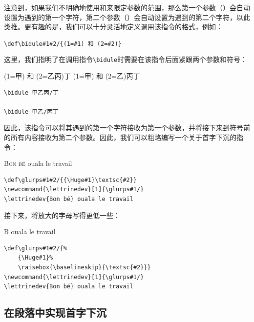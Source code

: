 注意到，如果我们不明确地使用\dm{\{}和\dm{\}}来限定参数的范围，那么第一个参数（）会自动设置为遇到的第一个字符，第二个参数（）会自动设置为遇到的第二个字符，以此类推。更有趣的是，我们可以十分灵活地定义调用该指令的格式，例如：

\begin{dmd}
\verb|\def\bidule#1#2/{(1=#1) 和 (2=#2)}|
\end{dmd}

这里，我们指明了在调用指令\verb|\bidule|时需要在该指令后面紧跟两个参数和符号\dm{/}：

\begin{codelist}[11.20]{
\def\bidule#1#2/{(1=#1) 和 (2=#2)}
\bidule 甲乙丙/丁
\bidule 甲乙/丙丁
}
\begin{verbatim}
\bidule 甲乙丙/丁

\bidule 甲乙/丙丁\end{verbatim}
\end{codelist}

因此，该指令可以将其遇到的第一个字符接收为第一个参数，并将接下来到符号\dm{/}前的所有内容接收为第二个参数。因此，我们可以粗略编写一个关于首字下沉的指令：

\begin{codelist}[11.21]{
\def\glurps#1#2/{{\Huge#1}\textsc{#2}}
\newcommand{\lettrinedev}[1]{\glurps#1/}
\lettrinedev{Bon bé} ouala le travail
}
\begin{verbatim}
\def\glurps#1#2/{{\Huge#1}\textsc{#2}}
\newcommand{\lettrinedev}[1]{\glurps#1/}
\lettrinedev{Bon bé} ouala le travail\end{verbatim}
\end{codelist}

接下来，将放大的字母写得更低一些：

\begin{codelist}[11.22]{
    \def\glurps#1#2/{%
    {\Huge#1}%
    \raisebox{\baselineskip}{\textsc{#2}}}
\newcommand{\lettrinedev}[1]{\glurps#1/}
\lettrinedev{Bon bé} ouala le travail
}
\begin{verbatim}
\def\glurps#1#2/{%
    {\Huge#1}%
    \raisebox{\baselineskip}{\textsc{#2}}}
\newcommand{\lettrinedev}[1]{\glurps#1/}
\lettrinedev{Bon bé} ouala le travail\end{verbatim}
\end{codelist}

\subsection{在段落中实现首字下沉}

